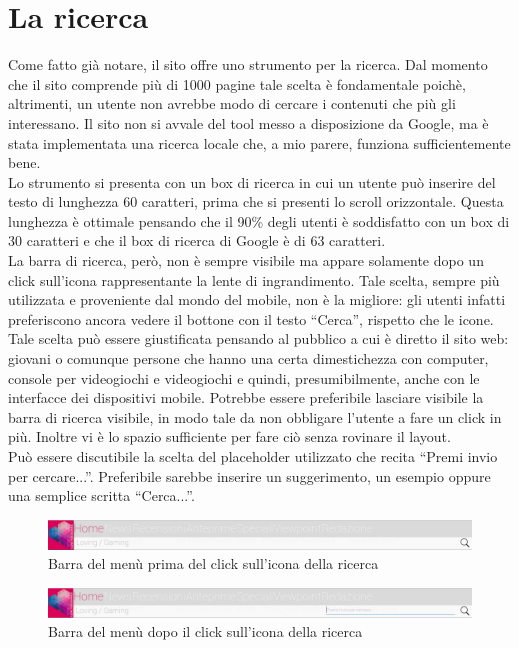 \documentclass[../ProgettoTecWeb2.tex]{subfiles}
\begin{document}
\section{La ricerca}
	Come fatto già notare, il sito offre uno strumento per la ricerca. Dal momento che il sito comprende più di 1000 pagine tale scelta è fondamentale poichè, altrimenti, un utente non avrebbe modo di cercare i contenuti che più gli interessano. Il sito non si avvale del tool messo a disposizione da Google, ma è stata implementata una ricerca locale che, a mio parere, funziona sufficientemente bene. \\
	Lo strumento si presenta con un box di ricerca in cui un utente può inserire del testo di lunghezza 60 caratteri, prima che si presenti lo scroll orizzontale. Questa lunghezza è ottimale pensando che il 90\% degli utenti è soddisfatto con un box di 30 caratteri e che il box di ricerca di Google è di 63 caratteri. \\
	La barra di ricerca, però, non è sempre visibile ma appare solamente dopo un click sull'icona rappresentante la lente di ingrandimento. Tale scelta, sempre più utilizzata e proveniente dal mondo del mobile, non è la migliore: gli utenti infatti preferiscono ancora vedere il bottone con il testo ``Cerca'', rispetto che le icone. Tale scelta può essere giustificata pensando al pubblico a cui è diretto il sito web: giovani o comunque persone che hanno una certa dimestichezza con computer, console per videogiochi e videogiochi e quindi, presumibilmente, anche con le interfacce dei dispositivi mobile. Potrebbe essere preferibile lasciare visibile la barra di ricerca visibile, in modo tale da non obbligare l'utente a fare un click in più. Inoltre vi è lo spazio sufficiente per fare ciò senza rovinare il layout. \\
	Può essere discutibile la scelta del placeholder utilizzato che recita ``Premi invio per cercare...''. Preferibile sarebbe inserire un suggerimento, un esempio oppure una semplice scritta ``Cerca...''.
	\begin{figure} [H]
		\centering
		\includegraphics[scale=0.3]{img/BarraMenuILoveVg}
		\caption{Barra del menù prima del click sull'icona della ricerca}
	\end{figure}
	\begin{figure} [H]
		\centering
		\includegraphics[scale=0.3]{img/BarraMenuILoveVgDopoClick}
		\caption{Barra del menù dopo il click sull'icona della ricerca}
	\end{figure}
\end{document}

